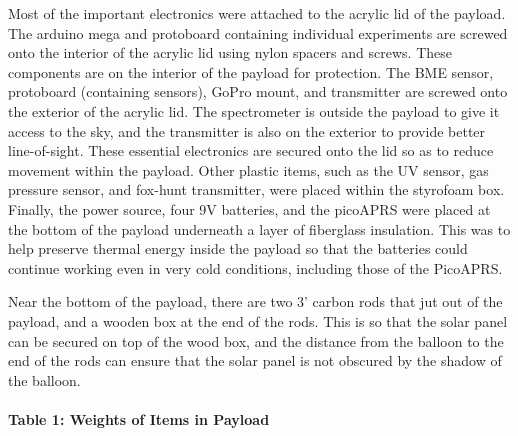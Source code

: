 \documentclass[12pt,]{article}
\let\oldparagraph\paragraph
\renewcommand{\paragraph}[1]{\oldparagraph{#1}\mbox{}}
\begin{document}
Most of the important electronics were attached to the acrylic lid of
the payload. The arduino mega and protoboard containing individual
experiments are screwed onto the interior of the acrylic lid using nylon
spacers and screws. These components are on the interior of the payload
for protection. The BME sensor, protoboard (containing sensors), GoPro
mount, and transmitter are screwed onto the exterior of the acrylic lid.
The spectrometer is outside the payload to give it access to the sky,
and the transmitter is also on the exterior to provide better
line-of-sight. These essential electronics are secured onto the lid so
as to reduce movement within the payload. Other plastic items, such as
the UV sensor, gas pressure sensor, and fox-hunt transmitter, were
placed within the styrofoam box. Finally, the power source, four 9V
batteries, and the picoAPRS were placed at the bottom of the payload
underneath a layer of fiberglass insulation. This was to help preserve
thermal energy inside the payload so that the batteries could continue
working even in very cold conditions, including those of the PicoAPRS.

Near the bottom of the payload, there are two 3' carbon rods that jut
out of the payload, and a wooden box at the end of the rods. This is so
that the solar panel can be secured on top of the wood box, and the
distance from the balloon to the end of the rods can ensure that the
solar panel is not obscured by the shadow of the balloon.

\paragraph{Table 1: Weights of Items in
Payload}\label{table-1-weights-of-items-in-payload}
\end{document}
